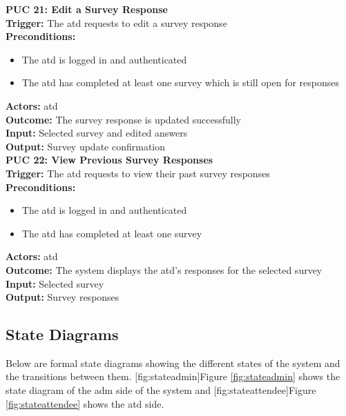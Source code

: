 \documentclass[12pt]{article}
\begin{document}
{\textbf{PUC 21: Edit a Survey Response} \\
\textbf{Trigger:} The \gls{atd} requests to edit a survey response \\
\textbf{Preconditions:}
\begin{itemize}
  \item The \gls{atd} is logged in and authenticated
  \item The \gls{atd} has completed at least one survey which is still open for responses
\end{itemize}
\textbf{Actors:} \Gls{atd} \\
\textbf{Outcome:} The survey response is updated successfully \\
\textbf{Input:} Selected survey and edited answers \\
\textbf{Output:} Survey update confirmation \\[1em]

\textbf{PUC 22: View Previous Survey Responses} \\
\textbf{Trigger:} The \gls{atd} requests to view their past survey responses \\
\textbf{Preconditions:}
\begin{itemize}
  \item The \gls{atd} is logged in and authenticated
  \item The \gls{atd} has completed at least one survey
\end{itemize}
\textbf{Actors:} \Gls{atd} \\
\textbf{Outcome:} The system displays the \gls{atd}’s responses for the selected survey \\
\textbf{Input:} Selected survey \\
\textbf{Output:} Survey responses \\
}

\subsection{State Diagrams}

Below are formal state diagrams showing the different states of the system and the transitions between them. [fig:stateadmin]{Figure \ref{fig:stateadmin}} shows the state diagram of the \gls{adm} side of the system and [fig:stateattendee]{Figure \ref{fig:stateattendee}} shows the \gls{atd} side.
\end{document}
